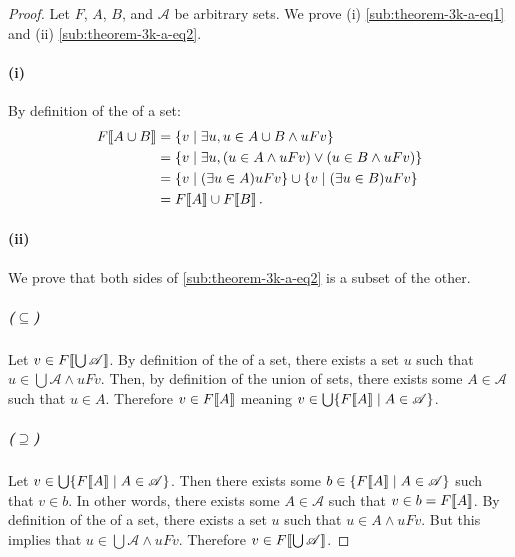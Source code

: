 \documentclass{report}
\begin{document}
  \begin{proof}
    Let $F$, $A$, $B$, and $\mathscr{A}$ be arbitrary sets.
    We prove (i) \eqref{sub:theorem-3k-a-eq1} and (ii)
      \eqref{sub:theorem-3k-a-eq2}.

    \paragraph{(i)}%

      By definition of the  of a set:
        \begin{align*}
          F\!\left\llbracket A \cup B\right\rrbracket
            & = \{v \mid \exists u, u \in A \cup B \land uFv\} \\
            & = \{v \mid \exists u,
              (u \in A \land uFv) \lor (u \in B \land uFv)\} \\
            & = \{v \mid (\exists u \in A) uFv\} \cup
              \{v \mid (\exists u \in B) uFv\} \\
            & = F\!\left\llbracket A\right\rrbracket \cup F\!\left\llbracket B\right\rrbracket.
        \end{align*}

    \paragraph{(ii)}%

      We prove that both sides of \eqref{sub:theorem-3k-a-eq2} is a subset of
        the other.

      \subparagraph{($\subseteq$)}%

        Let $v \in F\!\left\llbracket\bigcup{\mathscr{A}}\right\rrbracket$.
        By definition of the  of a set, there exists a set
          $u$ such that $u \in \bigcup{\mathscr{A}} \land uFv$.
        Then, by definition of the union of sets, there exists some
          $A \in \mathscr{A}$ such that $u \in A$.
        Therefore $v \in F\!\left\llbracket A\right\rrbracket$ meaning
          $v \in \bigcup\{F\!\left\llbracket A\right\rrbracket \mid A \in \mathscr{A}\}$.

      \subparagraph{($\supseteq$)}%

        Let $v \in \bigcup\{F\!\left\llbracket A\right\rrbracket \mid A \in \mathscr{A}\}$.
        Then there exists some $b \in \{F\!\left\llbracket A\right\rrbracket \mid A \in \mathscr{A}\}$
          such that $v \in b$.
        In other words, there exists some $A \in \mathscr{A}$ such that
          $v \in b = F\!\left\llbracket A\right\rrbracket$.
        By definition of the  of a set, there exists a set
          $u$ such that $u \in A \land uFv$.
        But this implies that $u \in \bigcup{\mathscr{A}} \land uFv$.
        Therefore $v \in F\!\left\llbracket\bigcup{\mathscr{A}}\right\rrbracket$.

  \end{proof}
\end{document}
